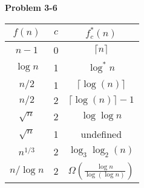 \documentclass{article}
\begin{document}
\noindent\textbf{Problem 3-6}\\

\begin{tabular}{c|c|c|}
$f(n)$ & $c$ & $f_c^*(n)$ \\ \hline
$n-1$ & 0 & $\lceil n \rceil $ \\ \hline
$\log n$ & 1 & $\log^*n$ \\ \hline
$n/2$ & 1 &  $\lceil \log(n) \rceil $ \\ \hline
$n/2$ & $2$ & $\lceil \log(n) \rceil - 1$ \\ \hline
$\sqrt{n}$ & 2 & $\log \log n$ \\ \hline
$\sqrt{n}$ & 1 & undefined \\ \hline
$n^{1/3}$ & 2 & $\log_3 \log_2(n)$ \\ \hline
$n / \log n$ & 2 & $\Omega\left(\frac{\log n}{\log(\log n)} \right)$ \\ \hline
\end{tabular}\\
\end{document}
